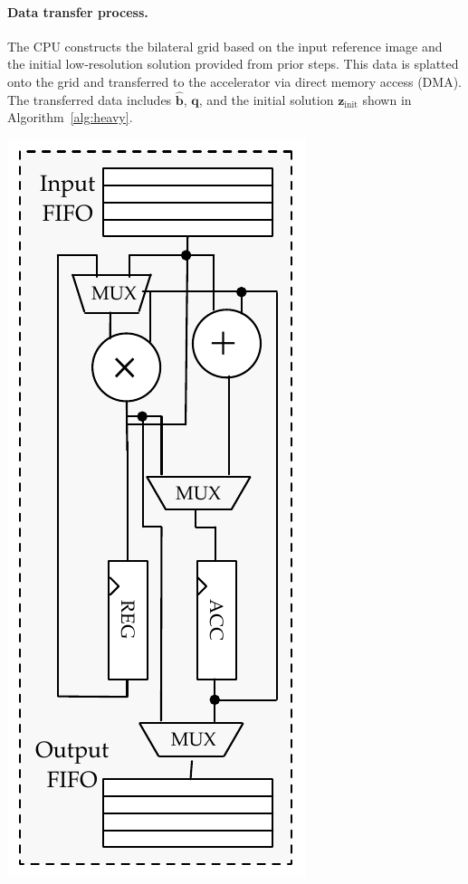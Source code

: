 \paragraph{Data transfer process. }The CPU constructs the bilateral grid based on the input reference image and the initial low-resolution solution provided from prior steps.
This data is splatted onto the grid and transferred to the accelerator via direct memory access (DMA).
The transferred data includes $\hat{\mathbf{b}}$, $\mathbf{q}$, and the initial solution $\mathbf{z}_{\mathrm{init}}$ shown in Algorithm~\ref{alg:heavy}.

\begin{marginfigure}
\includegraphics[width=.75\columnwidth]{hfbs-figs/worker_microarchitecture.pdf}


\end{marginfigure}
